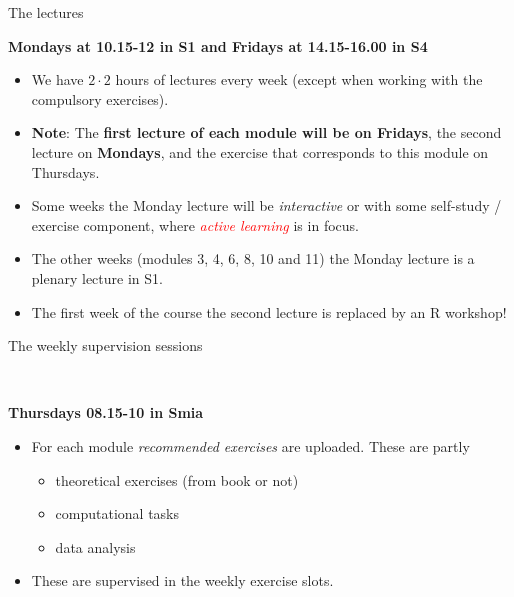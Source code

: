 \documentclass[10pt,ignorenonframetext,]{beamer}
\providecommand{\tightlist}{%
  \setlength{\itemsep}{0pt}\setlength{\parskip}{0pt}}
\begin{document}
\begin{frame}

\begin{block}{The lectures}

\vspace{2mm}

\textbf{Mondays at 10.15-12 in S1 and Fridays at 14.15-16.00 in S4}

\begin{itemize}
\item
  We have \(2\cdot 2\) hours of lectures every week (except when working
  with the compulsory exercises).
\item
  \textbf{Note}: The \textbf{first lecture of each module will be on
  Fridays}, the second lecture on \textbf{Mondays}, and the exercise
  that corresponds to this module on Thursdays.
\item
  Some weeks the Monday lecture will be \emph{interactive} or with some
  self-study / exercise component, where
  \emph{\textcolor{red}{active learning}} is in focus.
\item
  The other weeks (modules 3, 4, 6, 8, 10 and 11) the Monday lecture is
  a plenary lecture in S1.
\item
  The first week of the course the second lecture is replaced by an R
  workshop!
\end{itemize}

\end{block}

\end{frame}

\begin{frame}

\begin{block}{The weekly supervision sessions}

~

\textbf{Thursdays 08.15-10 in Smia} ~\\
\hspace*{0.333em}

\begin{itemize}
\tightlist
\item
  For each module \emph{recommended exercises} are uploaded. These are
  partly

  \begin{itemize}
  \tightlist
  \item
    theoretical exercises (from book or not)
  \item
    computational tasks
  \item
    data analysis
  \end{itemize}
\item
  These are supervised in the weekly exercise slots.
\end{itemize}

\end{block}

\end{frame}
\end{document}
